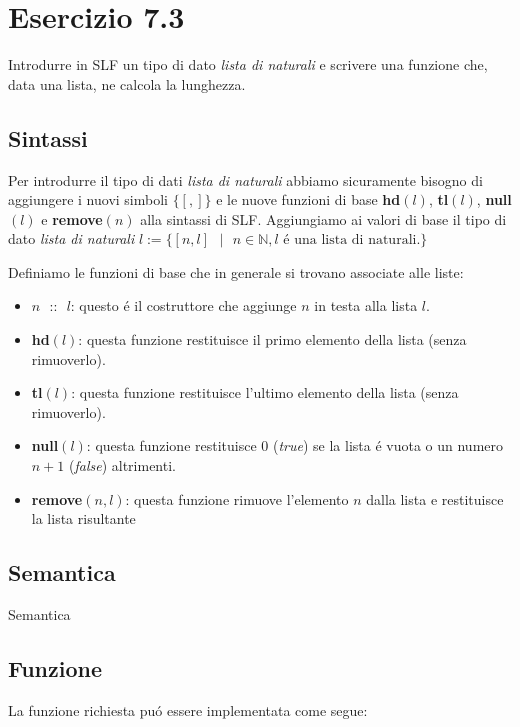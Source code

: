 		\newpage
		
	\section{Esercizio 7.3}
		\qquad Introdurre in SLF un tipo di dato \emph{lista di naturali} e scrivere
		una funzione che, data una lista, ne calcola la lunghezza.
		
		\sectionline
		
		\subsection{Sintassi}
		
		\qquad Per introdurre il tipo di dati \emph{lista di naturali} abbiamo
		sicuramente bisogno di aggiungere i nuovi simboli $\{[,]\}$ e le nuove
		funzioni di base \textbf{hd}$(l)$, \textbf{tl}$(l)$, \textbf{null}$(l)$ e
		\textbf{remove}$(n)$ alla sintassi di SLF. Aggiungiamo ai valori di base il tipo di dato
		\emph{lista di naturali} $l := \{[n,l]\text{ }|\text{ }n \in
		\mathbb{N},l\text{ \'e una lista di naturali.}\}$
		
		Definiamo le funzioni di base che in generale si trovano associate alle
		liste:
		\begin{itemize}
		  \item $n\text{ }\textbf{::}\text{ }l$: questo \'e il costruttore che aggiunge
		  $n$ in testa alla lista $l$.
		  \item \textbf{hd}$(l)$: questa funzione restituisce il primo elemento della
		  lista (senza rimuoverlo).
		  \item \textbf{tl}$(l)$: questa funzione restituisce l'ultimo elemento della
		  lista (senza rimuoverlo).
		  \item \textbf{null}$(l)$: questa funzione restituisce $0$ (\emph{true})
		  se la lista \'e vuota o un numero $n+1$ (\emph{false}) altrimenti.
		  \item \textbf{remove}$(n,l)$: questa funzione rimuove l'elemento $n$ dalla
		  lista e restituisce la lista risultante
		\end{itemize}
				
		\subsection{Semantica}
		\qquad Semantica
		
		
		
		\subsection{Funzione}
		\qquad La funzione richiesta pu\'o essere implementata come segue:
		
